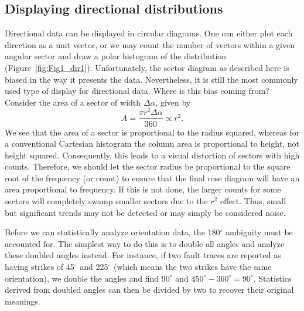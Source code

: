 \subsection{Displaying directional distributions}
	Directional data can be displayed in circular diagrams.  One can either plot each direction as 
a unit vector, or we may count the number of vectors within a given angular sector and draw a polar histogram of 
the distribution (Figure~\ref{fig:Fig1_dir1}):
\noindent
Unfortunately, the sector diagram as described here is biased in the way it presents the data. 
Nevertheless, it is still the most commonly used type of display for directional data.  Where is this bias
coming from? Consider the area of a sector of width $\Delta \alpha$, given by
\begin{equation}
A=\frac{\pi r^{2}\Delta\alpha}{360} \propto r^2.
\end{equation}
We see that the area of a sector is proportional to the radius squared, whereas for a conventional Cartesian histogram the 
column area is proportional to height, not height squared.  Consequently, this leads to a visual distortion of
sectors with high counts.  Therefore, we should let the sector 
radius be proportional to the square root of the frequency (or count) to ensure that the final rose diagram 
will have an area proportional to frequency.  If this is not done, the larger counts for some sectors will completely 
swamp smaller sectors due to the $r^2$ effect.  Thus, small but significant trends may not be 
detected or may simply be considered noise.

	Before we can statistically analyze orientation data, the 180$^{\circ}$ ambiguity must be accounted 
for.  The simplest way to do this is to double all angles and analyze these doubled angles instead.  For instance, if 
two fault traces are reported as having strikes of 45$^{\circ}$ and 225$^{\circ}$ (which means the two strikes have the 
same orientation), we double the angles and find $90^{\circ}$ and $450^{\circ} - 360^{\circ} = 90^{\circ}$.
Statistics derived from doubled angles can then be divided by two to recover their original meanings.

